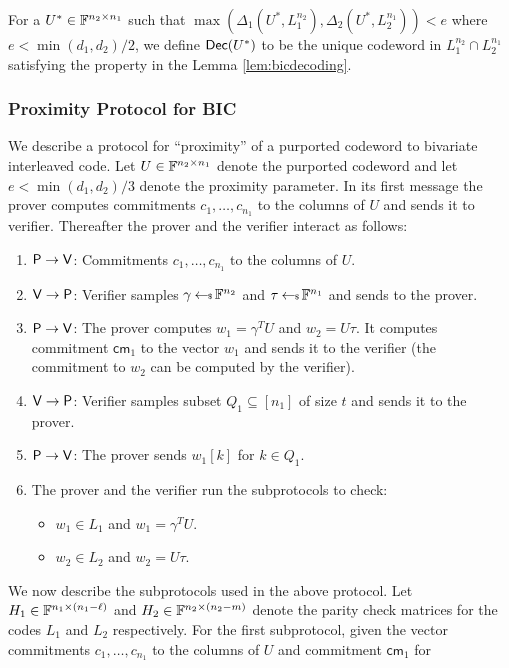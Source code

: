 For a $U^\ast\in \mathbb{F}^{n_2\times n_1}$ such that
$\max(\Delta_1(U^\ast,L_1^{n_2}),\Delta_2(U^\ast,L_2^{n_1}))<e$ where $e <
\min(d_1,d_2)/2$, we define $\mathsf{Dec}(U^\ast)$ to be the unique codeword in
$L_1^{n_2}\cap L_2^{n_1}$ satisfying the property in the Lemma
\ref{lem:bicdecoding}. 

\subsubsection{Proximity Protocol for BIC}\label{sec:proximitybic}
We describe a protocol for ``proximity'' of a purported codeword to bivariate
interleaved code. Let $U\in \mathbb{F}^{n_2\times n_1}$ denote the purported codeword and let
$e<\min(d_1,d_2)/3$ denote the proximity parameter. In its first message the
prover computes commitments $c_1,\ldots,c_{n_1}$ to the columns of $U$ and
sends it to verifier. Thereafter the prover and the verifier interact as
follows:
\begin{enumerate}[{\rm 1.}]
\item $\mathsf{P}\rightarrow \mathsf{V}$: Commitments $c_1,\ldots,c_{n_1}$ to the
columns of $U$.
\item $\mathsf{V}\rightarrow \mathsf{P}$: Verifier samples $\gamma\hskip2.3pt{\gets\!\!\mbox{\tiny${\$}$\normalsize}}\,
\mathbb{F}^{n_2}$ and $\tau\hskip2.3pt{\gets\!\!\mbox{\tiny${\$}$\normalsize}}\, \mathbb{F}^{n_1}$ and sends to the prover.
\item $\mathsf{P}\rightarrow \mathsf{V}$: The prover computes $w_1=\gamma^TU$ and
$w_2=U\tau$. It computes commitment $\mathsf{cm}_1$ to the
vector $w_1$ and sends it to the verifier (the commitment to $w_2$ can be computed by the
verifier). 
\item $\mathsf{V}\rightarrow \mathsf{P}$: Verifier samples subset $Q_1\subseteq
[n_1]$ of size $t$ and sends it to the prover.
\item $\mathsf{P}\rightarrow\mathsf{V}$: The prover sends $w_1[k]$ for $k\in Q_1$.
\item The prover and the verifier run the subprotocols to check:
  \begin{itemize}
  \item $w_1\in L_1$ and $w_1=\gamma^TU$.
  \item $w_2\in L_2$ and $w_2=U\tau$.
  \end{itemize}
\end{enumerate}
We now describe the subprotocols used in the above protocol.
Let $H_1\in \mathbb{F}^{n_1\times (n_1-\ell)}$ and $H_2\in \mathbb{F}^{n_2\times (n_2-m)}$
denote the parity check matrices for the codes $L_1$ and $L_2$
respectively. For the first subprotocol, given the vector commitments
$c_1,\ldots,c_{n_1}$ to the columns of $U$ and commitment $\mathsf{cm}_1$ for
